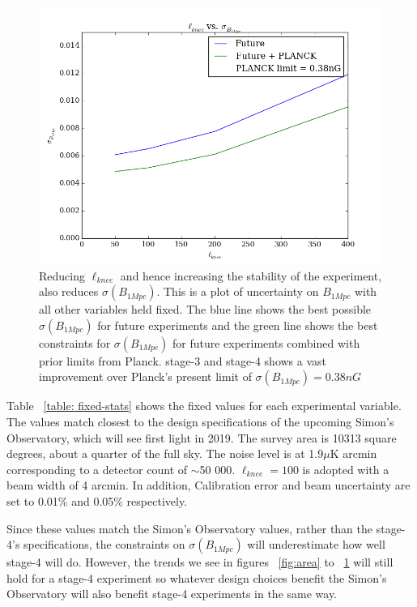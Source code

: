 \begin{figure}[h]
\centering
\includegraphics[scale=0.7]{images/knee.png}
\caption{Reducing $\ell_{knee}$ and hence increasing the stability of the experiment, also reduces $\sigma(B_{1Mpc})$. This is a plot of uncertainty on $B_{1Mpc}$ with all other variables held fixed. The blue line shows the best possible $\sigma(B_{1Mpc})$ for future experiments and the green line shows the best constraints for $\sigma(B_{1Mpc})$ for future experiments combined with prior limits from Planck. stage-3 and stage-4 shows a vast improvement over Planck's present limit of $\sigma(B_{1Mpc}) = 0.38nG$}
\label{fig:knee}
\end{figure}

Table ~\ref{table: fixed-stats} shows the fixed values for each experimental variable. The values match closest to the design specifications of the upcoming Simon's Observatory, which will see first light in 2019. The survey area is 10313 square degrees, about a quarter of the full sky. The noise level is at 1.9$\mu$K arcmin corresponding to a detector count of $\sim$50 000. $\ell_{knee} = 100$ is adopted with a beam width of 4 arcmin. In addition, Calibration error and beam uncertainty are set to 0.01\% and 0.05\% respectively.

Since these values match the Simon's Observatory values, rather than the stage-4's specifications, the constraints on $\sigma(B_{1Mpc})$ will underestimate how well stage-4 will do. However, the trends we see in figures ~\ref{fig:area} to ~\ref{fig:knee} will still hold for a stage-4 experiment so whatever design choices benefit the Simon's Observatory will also benefit stage-4 experiments in the same way.

